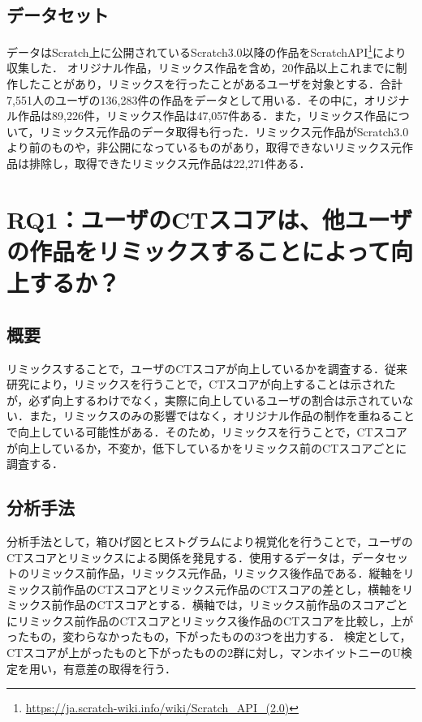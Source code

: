 \documentclass[11pt]{jreport}
\begin{document}
\section{データセット}
データはScratch上に公開されているScratch3.0以降の作品をScratchAPI\footnote{\url{https://ja.scratch-wiki.info/wiki/Scratch_API_(2.0)}}により収集した．
オリジナル作品，リミックス作品を含め，20作品以上これまでに制作したことがあり，リミックスを行ったことがあるユーザを対象とする．合計7,551人のユーザの136,283件の作品をデータとして用いる．その中に，オリジナル作品は89,226件，リミックス作品は47,057件ある．また，リミックス作品について，リミックス元作品のデータ取得も行った．リミックス元作品がScratch3.0より前のものや，非公開になっているものがあり，取得できないリミックス元作品は排除し，取得できたリミックス元作品は22,271件ある．
\begin{table}[t]
    \centering
    \caption{各データセットの数}
    \label{CTscoreTable}
\end{table}
\chapter{RQ1：ユーザのCTスコアは、他ユーザの作品をリミックスすることによって向上するか？}

\section{概要}
リミックスすることで，ユーザのCTスコアが向上しているかを調査する．従来研究により，リミックスを行うことで，CTスコアが向上することは示されたが，必ず向上するわけでなく，実際に向上しているユーザの割合は示されていない．また，リミックスのみの影響ではなく，オリジナル作品の制作を重ねることで向上している可能性がある．そのため，リミックスを行うことで，CTスコアが向上しているか，不変か，低下しているかをリミックス前のCTスコアごとに調査する．

\section{分析手法}
分析手法として，箱ひげ図とヒストグラムにより視覚化を行うことで，ユーザのCTスコアとリミックスによる関係を発見する．使用するデータは，データセットのリミックス前作品，リミックス元作品，リミックス後作品である．縦軸をリミックス前作品のCTスコアとリミックス元作品のCTスコアの差とし，横軸をリミックス前作品のCTスコアとする．横軸では，リミックス前作品のスコアごとにリミックス前作品のCTスコアとリミックス後作品のCTスコアを比較し，上がったもの，変わらなかったもの，下がったものの3つを出力する．
検定として，CTスコアが上がったものと下がったものの2群に対し，マンホイットニーのU検定を用い，有意差の取得を行う．
\end{document}
